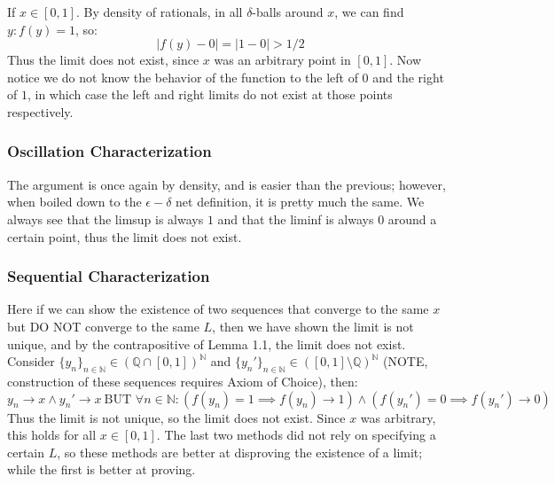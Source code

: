 \documentclass[10pt,letterpaper]{article} %
\begin{document}
If $x \in [0, 1]$. By density of rationals, in all $\delta$-balls around $x$, we can find $y: f(y) = 1$, so:
\begin{equation*}
|f(y) - 0| = |1-0| > 1/2
\end{equation*}
Thus the limit does not exist, since $x$ was an arbitrary point in $[0, 1]$. Now notice we do not know the behavior of the function to the left of $0$ and the right of $1$, in which case the left and right limits do not exist at those points respectively.

\medskip
\subsubsection*{Oscillation Characterization}
The argument is once again by density, and is easier than the previous; however, when boiled down to the $\epsilon-\delta$ net definition, it is pretty much the same. We always see that the limsup is always $1$ and that the liminf is always $0$ around a certain point, thus the limit does not exist. 

\medskip
\subsubsection*{Sequential Characterization}
Here if we can show the existence of two sequences that converge to the same $x$ but DO NOT converge to the same $L$, then we have shown the limit is not unique, and by the contrapositive of Lemma 1.1, the limit does not exist.\\

Consider $\{y_n\}_{n \in \mathbb{N}} \in (\mathbb{Q} \cap [0, 1])^\mathbb{N}$ and $\{y_n'\}_{n \in \mathbb{N}} \in ([0, 1] \setminus \mathbb{Q})^\mathbb{N}$ (NOTE, construction of these sequences requires Axiom of Choice), then:
\begin{equation*}
  y_n \xrightarrow{} x \land y_n' \xrightarrow{}x \ \text{BUT } \forall n \in \mathbb{N}: (f(y_n) = 1 \implies f(y_n) \xrightarrow{} 1) \land (f(y_n') = 0 \implies f(y_n') \xrightarrow{} 0)
\end{equation*}
Thus the limit is not unique, so the limit does not exist. Since $x$ was arbitrary, this holds for all $x \in [0, 1]$. The last two methods did not rely on specifying a certain $L$, so these methods are better at disproving the existence of a limit; while the first is better at proving.
\end{document}
